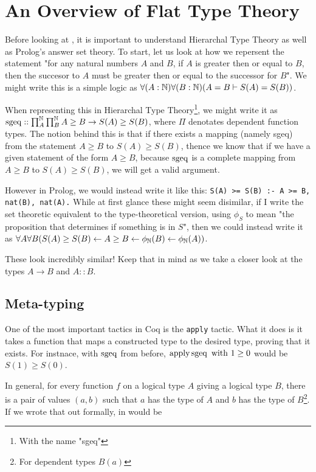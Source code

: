 \section{An Overview of Flat Type Theory}

Before looking at \this, it is important to understand Hierarchal Type Theory as well as Prolog's answer set theory.
To start, let us look at how we repersent the statement "for any natural numbers $A$ and $B$, if $A$ is greater then or equal to $B$, then the succesor to $A$ must be greater then or equal to the successor for $B$".
We might write this is a simple logic as $\forall (A : \mathbb{N}) \forall (B : \mathbb{N}) (A = B \vdash S(A) = S(B))$.

When representing this in Hierarchal Type Theory\footnote{With the name "sgeq"}, we might write it as $\operatorname{sgeq} :: \prod_{A}^{\mathbb{N}} \prod_{B}^{\mathbb{N}} A \geq B \to S(A) \geq S(B)$, where $\Pi$ denotates dependent function types.
The notion behind this is that if there exists a mapping (namely sgeq) from the statement $A \geq B$ to $S(A) \geq S(B)$, thence we know that if we have a given statement of the form $A \geq B$, because $\operatorname{sgeq}$ is a complete mapping from $A \geq B$ to $S(A) \geq S(B)$, we will get a valid argument.

However in Prolog, we would instead write it like this: \verb|S(A) >= S(B) :- A >= B, nat(B), nat(A).|
While at first glance these might seem disimilar, if I write the set theoretic equivalent to the type-theoretical version, using $\phi_S$ to mean "the proposition that determines if something is in $S$", then we could instead write it as $\forall A \forall B (S(A) \geq S(B) \leftarrow A \geq B \leftarrow \phi_{\mathbb{N}} (B) \leftarrow \phi_{\mathbb{N}} (A)) $.

These look incredibly similar!
Keep that in mind as we take a closer look at the types $A \to B$ and $A :: B$.

\subsection{Meta-typing}

One of the most important tactics in Coq is the \verb|apply| tactic\needcite.
What it does is it takes a function that maps a constructed type to the desired type, proving that it exists.
For instnace, with $\operatorname{sgeq}$ from before, $\operatorname{apply} \operatorname{sgeq} \ \mathrm{with} \ 1 \geq 0$ would be $S(1) \geq S(0)$.

In general, for every function $f$ on a logical type $A$ giving a logical type $B$, there is a pair of values $(a,b)$ such that $a$ has the type of $A$ and $b$ has the type of $B$\footnote{For dependent types $B(a)$}.
If we wrote that out formally, in would be 

